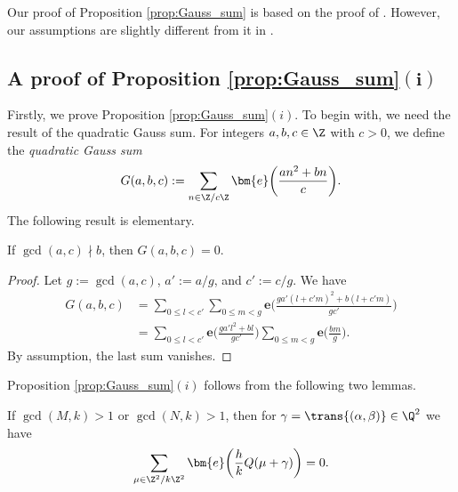 Our proof of Proposition \ref{prop:Gauss_sum} is based on the proof of \cite[Theorem 4.1]{BMM}.
However, our assumptions are slightly different from it in \cite[Theorem 4.1]{BMM}.


\subsection[A proof of Proposition 4.2(i)]
{A proof of Proposition \ref{prop:Gauss_sum}$\boldsymbol{(i)}$}%


Firstly, we prove Proposition \ref{prop:Gauss_sum}$(i)$.
To begin with, we need the result of the quadratic Gauss sum.
For integers $ a, b, c \in \Z $ with $ c > 0 $, we define the \textit{quadratic Gauss sum}
\begin{gather*}
G(a, b, c) := \sum_{n \in \Z/c\Z} \bm{e} \bigg(\frac{an^2 + bn}{c}\bigg).
\end{gather*}
The following result is elementary.

\begin{lem} \label{lem:Gauss_sum_fundamental}
	If $ \gcd(a, c) \nmid b $, then $ G(a, b, c) = 0 $.
\end{lem}

\begin{proof}
	Let $g := \gcd(a, c)$, $a' := a/g$, and $c' := c/g$.
	We have
	\begin{align*}
G(a, b, c)
&= \sum_{0 \le l < c'} \sum_{0 \le m < g} \bm{e} \bigg( \frac{ga'(l+c'm)^2 + b(l+c'm)}{gc'} \bigg)
\\
&= \sum_{0 \le l < c'} \bm{e} \bigg( \frac{ga' l^2 + bl}{gc'} \bigg) \sum_{0 \le m < g} \bm{e}
\bigg(\frac{bm}{g} \bigg).
	\end{align*}
	By assumption, the last sum vanishes.
\end{proof}

Proposition \ref{prop:Gauss_sum}$(i)$ follows from the following two lemmas.

\begin{lem} \label{lem:Gauss_sum_zero_general}
	If $ \gcd(M, k) > 1 $ or $ \gcd(N, k) > 1 $, then for $ \gamma = \trans{(\alpha, \beta)} \in \Q^2 $ we have
	\begin{gather*}
	\sum_{\mu \in \Z^2/k\Z^2} \bm{e}\bigg( \frac{h}{k} Q(\mu + \gamma) \bigg)
	= 0.
	\end{gather*}
\end{lem}

